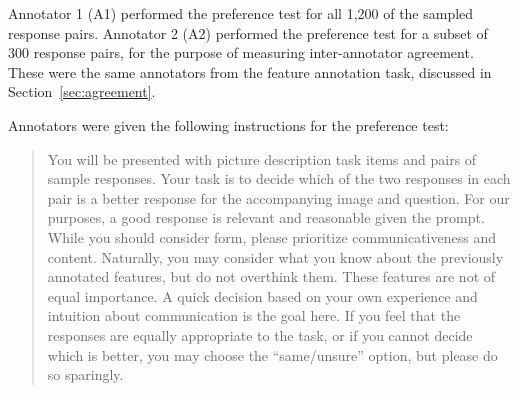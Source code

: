 Annotator 1 (A1) performed the preference test for all 1,200 of the sampled response pairs. Annotator 2 (A2) performed the preference test for a subset of 300 response pairs, for the purpose of measuring inter-annotator agreement. These were the same annotators from the feature annotation task, discussed in Section~\ref{sec:agreement}. 

Annotators were given the following instructions for the preference test:

\begin{quote}
You will be presented with picture description task items and pairs of sample responses. Your task is to decide which of the two responses in each pair is a better response for the accompanying image and question. For our purposes, a good response is relevant and reasonable given the prompt. While you should consider form, please prioritize communicativeness and content. Naturally, you may consider what you know about the previously annotated features, but do not overthink them. These features are not of equal importance. A quick decision based on your own experience and intuition about communication is the goal here. If you feel that the responses are equally appropriate to the task, or if you cannot decide which is better, you may choose the ``same/unsure'' option, but please do so sparingly.
\end{quote}

